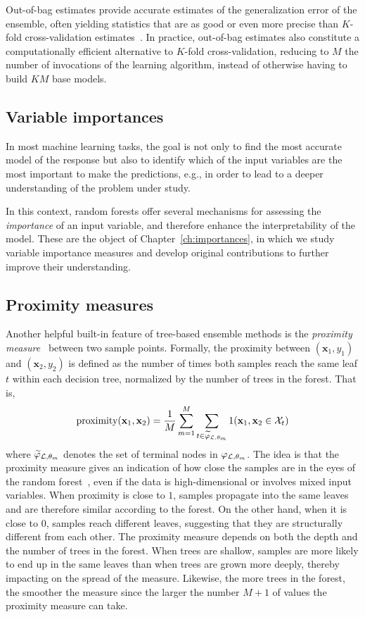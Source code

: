 Out-of-bag estimates provide accurate estimates of the
generalization error of the ensemble, often yielding statistics that are as
good or even more precise than $K$-fold cross-validation
estimates~\citep{wolpert:1999}. In practice, out-of-bag estimates also
constitute a computationally efficient alternative to $K$-fold cross-validation,
reducing to $M$ the number of invocations of the learning
algorithm, instead of otherwise having to build $KM$ base models.

\subsection{Variable importances}

In most machine learning tasks, the goal is not only to find the most accurate
model of the response but also to identify which of the input variables are the
most important to make the predictions, e.g., in order to lead to a deeper
understanding of the problem under study.

In this context, random forests offer several mechanisms for assessing the
\textit{importance} of an input variable, and therefore enhance the
interpretability of the model. These are the object of
Chapter~\ref{ch:importances}, in which we study variable importance measures
and develop original contributions to further improve their understanding.

\subsection{Proximity measures}

Another helpful built-in feature of tree-based ensemble methods is the
\textit{proximity measure}~\citep{breiman:2002} between two sample points. Formally, the proximity
between $(\mathbf{x}_1, y_1)$ and $(\mathbf{x}_2, y_2)$ is defined as the
number of times both samples reach the same leaf $t$ within each decision tree,
normalized by the number of trees in the forest. That is,
\begin{equation}
\text{proximity}(\mathbf{x}_1, \mathbf{x}_2) = \frac{1}{M} \sum_{m=1}^M \sum_{t \in \widetilde{\varphi}_{{\cal L},\theta_m}} 1(\mathbf{x}_1 , \mathbf{x}_2 \in {\cal X}_t)
\end{equation}
where $\widetilde{\varphi}_{{\cal L},\theta_m}$ denotes the set of terminal
nodes in $\varphi_{{\cal L},\theta_m}$. The idea is that the proximity measure
gives an indication of how close the  samples are in the eyes of the random
forest~\citep{hastie:2005}, even if the data is high-dimensional or involves
mixed input variables. When proximity is close to $1$, samples propagate into
the same leaves and are therefore similar according to the forest. On the other
hand, when it is close to $0$, samples reach different leaves, suggesting that
they are structurally different from each other. The proximity measure
depends on both the depth and the number of trees in the forest.
When trees are shallow, samples are more likely to end up in the same leaves
than when trees are grown more deeply, thereby impacting on the spread of the measure.
Likewise, the more trees in the forest, the smoother the measure since
the larger the number $M+1$ of values the proximity measure can take.

